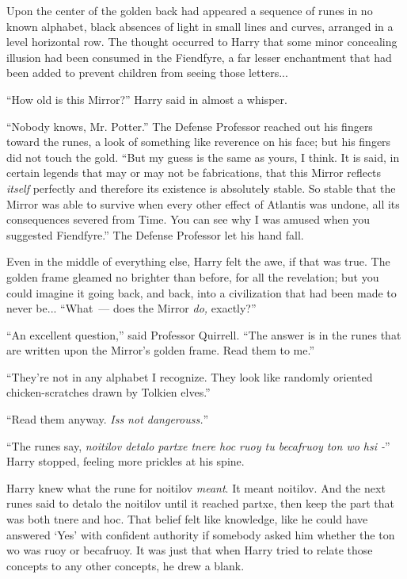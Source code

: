 Upon the center of the golden back had appeared a sequence of runes in no known alphabet, black absences of light in small lines and curves, arranged in a level horizontal row. The thought occurred to Harry that some minor concealing illusion had been consumed in the Fiendfyre, a far lesser enchantment that had been added to prevent children from seeing those letters...

``How old is this Mirror?'' Harry said in almost a whisper.

``Nobody knows, Mr. Potter.'' The Defense Professor reached out his fingers toward the runes, a look of something like reverence on his face; but his fingers did not touch the gold. ``But my guess is the same as yours, I think. It is said, in certain legends that may or may not be fabrications, that this Mirror reflects \emph{itself} perfectly and therefore its existence is absolutely stable. So stable that the Mirror was able to survive when every other effect of Atlantis was undone, all its consequences severed from Time. You can see why I was amused when you suggested Fiendfyre.'' The Defense Professor let his hand fall.

Even in the middle of everything else, Harry felt the awe, if that was true. The golden frame gleamed no brighter than before, for all the revelation; but you could imagine it going back, and back, into a civilization that had been made to never be... ``What~--- does the Mirror \emph{do,} exactly?''

``An excellent question,'' said Professor Quirrell. ``The answer is in the runes that are written upon the Mirror's golden frame. Read them to me.''

``They're not in any alphabet I recognize. They look like randomly oriented chicken-scratches drawn by Tolkien elves.''

``Read them anyway. \emph{Iss not dangerouss.}''

``The runes say, \emph{noitilov detalo partxe tnere hoc ruoy tu becafruoy ton wo hsi -}'' Harry stopped, feeling more prickles at his spine.

Harry knew what the rune for noitilov \emph{meant}. It meant noitilov. And the next runes said to detalo the noitilov until it reached partxe, then keep the part that was both tnere and hoc. That belief felt like knowledge, like he could have answered `Yes' with confident authority if somebody asked him whether the ton wo was ruoy or becafruoy. It was just that when Harry tried to relate those concepts to any other concepts, he drew a blank.

